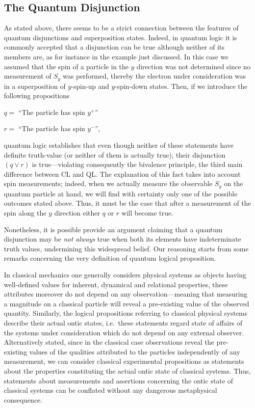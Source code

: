 \documentclass[11pt, executivepaper]{article}
\begin{document}
\subsection{The Quantum Disjunction}

As stated above, there seems to be a strict connection between the features of quantum disjunctions and superposition states. Indeed, in quantum logic it is commonly accepted that a disjunction can be true although neither of its members are, as for instance in the example just discussed. In this case we assumed that the spin of a particle in the $y$ direction was not determined since no measurement of $S_y$ was performed, thereby the electron under consideration was in a superposition of $y$-spin-up and $y$-spin-down states. Then, if we introduce the following propositions
\begin{description}
	\item $q =$ ``The particle has spin $y^+$''
	\item $r =$ ``The particle has spin $y^-$'',
\end{description}
\noindent quantum logic establishes that even though neither of these statements have definite truth-value (or neither of them is actually true), their disjunction $(q \vee r)$ is true---violating consequently the bivalence principle, the third main difference between CL and QL. The explanation of this fact takes into account spin measurements; indeed, when we actually measure the observable $S_y$ on the quantum particle at hand, we will find with certainty only one of the possible outcomes stated above. Thus, it must be the case that after a measurement of the spin along the $y$ direction either $q$ or $r$ will become true. 

Nonetheless, it is possible provide an argument claiming that a quantum disjunction may be \emph{not always} true when both its elements have indeterminate truth values, undermining this widespread belief. Our reasoning starts from some remarks concerning the very definition of quantum logical proposition.

In classical mechanics one generally considers physical systems as objects having well-defined values for inherent, dynamical and relational properties, these attributes moreover do not depend on any observation---meaning that measuring a magnitude on a classical particle will reveal a pre-existing value of the observed quantity. Similarly, the logical propositions referring to classical physical systems describe their actual ontic states, i.e.\ these statements regard state of affairs of the systems under consideration which do not depend on any external observer. Alternatively stated, since in the classical case observations reveal the pre-existing values of the qualities attributed to the particles independently of any measurement, we can consider classical experimental propositions as statements about the properties constituting the actual ontic state of classical systems. Thus, statements about measurements and assertions concerning the ontic state of classical systems can be conflated without any dangerous metaphysical consequence.
\end{document}
